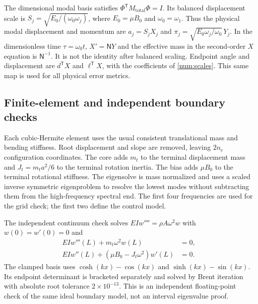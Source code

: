 The dimensional modal basis satisfies
$\Phi^{\mathsf T}M_{\mathrm{total}}\Phi=I$.
Its balanced displacement scale is
$S_j=\sqrt{E_0/(\omega_0\omega_j)}$, where $E_0=\mu B_0$ and
$\omega_0=\omega_1$. Thus the physical modal displacement and momentum
are $a_j=S_jX_j$ and
$\pi_j=\sqrt{E_0\omega_j/\omega_0}\,Y_j$.
In the dimensionless time $\tau=\omega_0t$,
$X'=\mathsf NY$ and the effective mass in the second-order $X$ equation is
$\mathsf N^{-1}$. It is not the identity after balanced scaling.
Endpoint angle and displacement are $d^{\mathsf T}X$ and
$\ell^{\mathsf T}X$, with the coefficients of
\eqref{num:scales}. This same map is used for all physical error metrics.

\subsection{Finite-element and independent boundary checks}
\label{sx:fe}
Each cubic-Hermite element uses the usual consistent translational
mass and bending stiffness. Root displacement and slope are removed,
leaving $2n_e$ configuration coordinates. The core adds $m_t$ to
the terminal displacement mass and $J_t=m_ta^2/6$ to the terminal
rotation inertia. The bias adds $\mu B_0$ to the terminal rotational
stiffness. The eigensolve is mass normalized and uses a scaled inverse
symmetric eigenproblem to resolve the lowest modes without subtracting
them from the high-frequency spectral end. The first four frequencies
are used for the grid check; the first two define the control model.

The independent continuum check solves
$EIw''''=\rho A\omega^2w$ with $w(0)=w'(0)=0$ and
\begin{equation}
 \begin{split}
 EIw'''(L)+m_t\omega^2w(L)&=0,\\
 EIw''(L)+(\mu B_0-J_t\omega^2)w'(L)&=0.
 \end{split}
 \label{sx:boundary-check}
\end{equation}
The clamped basis uses $\cosh(kx)-\cos(kx)$ and
$\sinh(kx)-\sin(kx)$. Its endpoint determinant is bracketed separately
and solved by Brent iteration with absolute root tolerance
$2\times10^{-13}$. This is an independent floating-point check of
the same ideal boundary model, not an interval eigenvalue proof.

